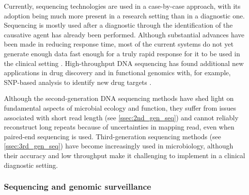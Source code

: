 Currently, sequencing technologies are used in a case-by-case approach, with its adoption being much more present in a research setting than in a diagnostic one. 
Sequencing is mostly used after a diagnostic through the identification of the causative agent has already been performed. 
Although substantial advances have been made in reducing response time, most of the current systems do not yet generate enough data fast enough for a truly rapid response for it to be used in the clinical setting \citep{goodwin_coming_2016}. 
High-throughput DNA sequencing has found additional new applications in drug discovery and in functional genomics with, for example, SNP-based analysis to identify new drug targets \citep{loman_twenty_2015}.

Although the second-generation DNA sequencing methods have shed light on fundamental aspects of microbial ecology and function, they suffer from issues associated with short read length (see \ref{ssec:2nd_gen_seq}) and cannot reliably reconstruct long repeats because of uncertainties in mapping read, even when paired-end sequencing is used. 
Third-generation sequencing methods (see \ref{ssec:3rd_gen_seq}) have become increasingly used in microbiology, although their accuracy and low throughput make it challenging to implement in a clinical diagnostic setting. 

\subsubsection{Sequencing and genomic surveillance} \label{sssec:sequencing_genomic_survaillance}

